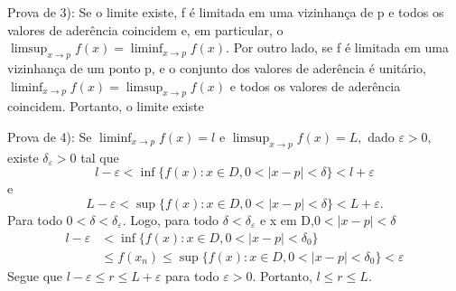 \documentclass[Analysis/analysis_notes.tex]{subfiles}
\begin{document}
\begin{proof*}
	Prova de 3): Se o limite existe, f \'e limitada em uma vizinhan\c ca de p e todos os valores de ader\^encia coincidem e,
	em particular, o $\limsup_{x\to p}f(x) = \liminf_{x\to p}f(x).$ Por outro lado, se f \'e limitada em uma vizinhan\c ca de um ponto p,
	e o conjunto dos valores de ader\^encia \'e unit\'ario, $\liminf_{x\to p}f(x)=\limsup_{x\to p}f(x)$ e todos os valores de ader\^encia
	coincidem. Portanto, o limite existe

	Prova de 4): Se $\liminf_{x\to p}f(x) = l$ e $\limsup_{x\to p}f(x) = L,$ dado $\varepsilon > 0,$ existe $\delta_{\varepsilon}>0$
	tal que
	$$
		l - \varepsilon < \inf{\{f(x):x\in D, 0<|x-p|<\delta\}} < l + \varepsilon
	$$
	e
	$$
		L - \varepsilon < \sup{\{f(x):x\in D, 0<|x-p|<\delta\}} < L + \varepsilon.
	$$
	Para todo $0<\delta<\delta_{\varepsilon}.$  Logo, para todo $\delta<\delta_{\varepsilon}$ e x em D,$0<|x-p|<\delta$
	\begin{align*}
		l - \varepsilon & < \inf\{f(x):x\in D, 0 < |x-p| < \delta_{0}\}                              \\
		                & \leq{}f(x_{n})\leq{}\sup\{f(x):x\in D, 0 <|x-p|<\delta_{0}\} < \varepsilon
	\end{align*}
	Segue que $l-\varepsilon\leq{r}\leq{L+\varepsilon}$ para todo $\varepsilon > 0$. Portanto, $l\leq{r}\leq{L}.$
\end{proof*}
\end{document}
